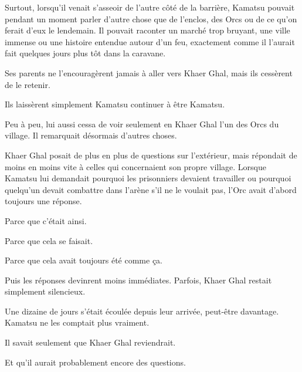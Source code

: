 Surtout, lorsqu'il venait s'asseoir de l'autre côté de la barrière, Kamatsu
pouvait pendant un moment parler d'autre chose que de l'enclos, des Orcs ou de
ce qu'on ferait d'eux le lendemain. Il pouvait raconter un marché trop bruyant,
une ville immense ou une histoire entendue autour d'un feu, exactement comme il
l'aurait fait quelques jours plus tôt dans la caravane.

Ses parents ne l'encouragèrent jamais à aller vers Khaer Ghal, mais ils
cessèrent de le retenir.

Ils laissèrent simplement Kamatsu continuer à être Kamatsu.

Peu à peu, lui aussi cessa de voir seulement en Khaer Ghal l'un des Orcs du
village. Il remarquait désormais d'autres choses.

Khaer Ghal posait de plus en plus de questions sur l'extérieur, mais répondait
de moins en moins vite à celles qui concernaient son propre village. Lorsque
Kamatsu lui demandait pourquoi les prisonniers devaient travailler ou pourquoi
quelqu'un devait combattre dans l'arène s'il ne le voulait pas, l'Orc avait
d'abord toujours une réponse.

Parce que c'était ainsi.

Parce que cela se faisait.

Parce que cela avait toujours été comme ça.

Puis les réponses devinrent moins immédiates. Parfois, Khaer Ghal restait
simplement silencieux.

Une dizaine de jours s'était écoulée depuis leur arrivée, peut-être davantage.
Kamatsu ne les comptait plus vraiment.

Il savait seulement que Khaer Ghal reviendrait.

Et qu'il aurait probablement encore des questions.